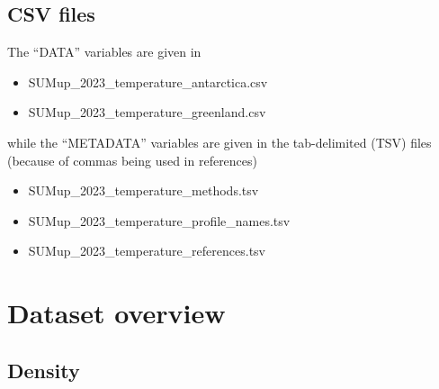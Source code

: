 \documentclass[journal abbreviation, manuscript]{copernicus}
\begin{document}
\subsection{CSV files}
The “DATA” variables are given in 
\begin{itemize}
\item SUMup\_2023\_temperature\_antarctica.csv 
\item SUMup\_2023\_temperature\_greenland.csv 
\end{itemize}
while the “METADATA” variables are given in the tab-delimited (TSV) files (because of commas being used in references)
\begin{itemize}
\item SUMup\_2023\_temperature\_methods.tsv
\item SUMup\_2023\_temperature\_profile\_names.tsv
\item SUMup\_2023\_temperature\_references.tsv
\end{itemize}



\section{Dataset overview}
\subsection{Density}

\small
{}
\small
{}
\end{document}
